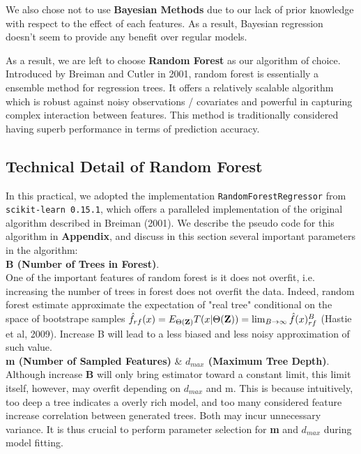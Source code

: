 \documentclass[11pt]{article}
\theoremstyle{definition}
\begin{document}
We also chose not to use \textbf{Bayesian Methods} due to our lack of prior knowledge with respect to the effect of each features. As a result, Bayesian regression doesn't seem to provide any benefit over regular models.

As a result, we are left to choose \textbf{Random Forest} as our algorithm of choice. Introduced by Breiman and Cutler in 2001, random forest is essentially a ensemble method for regression trees. It offers a relatively  scalable algorithm which is robust against noisy observations / covariates and powerful in capturing complex interaction between features. This method is traditionally considered having superb performance in terms of prediction accuracy.

\subsection{\textbf{Technical Detail of Random Forest}}
In this practical, we adopted the implementation {\tt RandomForestRegressor} from {\tt scikit-learn 0.15.1}, which offers a paralleled implementation of the original algorithm described in Breiman (2001). We describe the pseudo code for this algorithm in \textbf{Appendix}, and discuss in this section several important parameters in the algorithm:\\

\textbf{B (Number of Trees in Forest)}. \\
One of the important features of random forest is it does not overfit, i.e. increasing the number of trees in forest does not overfit the data. Indeed, random forest estimate approximate the expectation of "real tree" conditional on the space of bootstrape samples $\hat{f}_{rf}(x) = E_{\Theta({\bf Z})}T(x|\Theta({\bf Z})) = \lim_{B \rightarrow \infty} \hat{f}(x)_{rf}^B$ (Hastie et al, 2009). Increase B will lead to a less biased and less noisy approximation of such value.\\

\textbf{m (Number of Sampled Features)} \& \textbf{$d_{max}$ (Maximum Tree Depth)}. \\
Although increase \textbf{B} will only bring estimator toward a constant limit, this limit itself, however, may overfit depending on $d_{max}$ and m. This is because intuitively, too deep a tree indicates a overly rich model, and too many considered feature increase correlation between generated trees. Both may incur unnecessary variance. It is thus crucial to perform parameter selection for \textbf{m} and \textbf{$d_{max}$} during model fitting.
\end{document}
